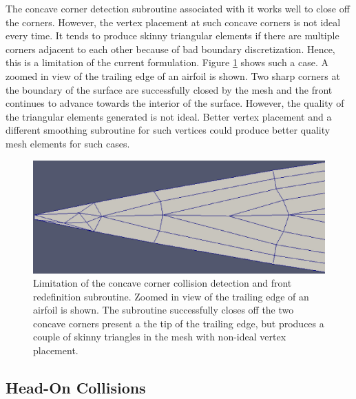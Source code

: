 The concave corner detection subroutine associated with it works well to close off the corners. However, the vertex placement at such concave corners is not ideal every time. It tends to produce skinny triangular elements if there are multiple corners adjacent to each other because of bad boundary discretization. Hence, this is a limitation of the current formulation. Figure \ref{fig-cornerLimitation} shows such a case. A zoomed in view of the trailing edge of an airfoil is shown. Two sharp corners at the boundary of the surface are successfully closed by the mesh and the front continues to advance towards the interior of the surface. However, the quality of the triangular elements generated is not ideal. Better vertex placement and a different smoothing subroutine for such vertices could produce better quality mesh elements for such cases.

\begin{figure}
\centering
\includegraphics[width=0.4\linewidth]{img/m2/cornerCollision/cornerLimitation.eps}
\caption{Limitation of the concave corner collision detection and front redefinition subroutine. Zoomed in view of the trailing edge of an airfoil is shown. The subroutine successfully closes off the two concave corners present a the tip of the trailing edge, but produces a couple of skinny triangles in the mesh with non-ideal vertex placement.}
\label{fig-cornerLimitation}
\end{figure}

\subsection{Head-On Collisions}

